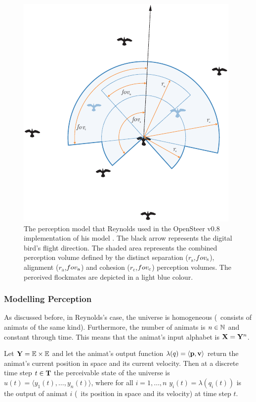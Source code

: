 \begin{figure}%
\includegraphics{fig[perception]cwr}
\caption{The perception model that Reynolds used in the OpenSteer v0.8 implementation of his model \cite{reynolds:1999}. The black arrow represents the digital bird's flight direction. The shaded area represents the combined perception volume defined by the distinct separation ($r_\mathrm{s}$,$fov_\mathrm{s}$), alignment ($r_\mathrm{a}$,$fov_\mathrm{a}$) and cohesion ($r_\mathrm{c}$,$fov_\mathrm{c}$) perception volumes. The perceived flockmates are depicted in a light blue colour.}
\label{fig:perception:cwr}
\end{figure}

\subsubsection{Modelling Perception}
As discussed before, in Reynolds's case, the universe is homogeneous (\ie\ consists of animats of the same kind). Furthermore, the number of animats is $n \in \mathbb{N}$ and constant through time. This means that the animat's input alphabet is ${\mathbf{X}}={\mathbf{Y}}^n$. 

Let ${\mathbf{Y}}=\mathbb{E} \times \mathbb{E}$ and let the animat's output function $\lambda(q)=\langle{\ensuremath{\mathbf{p}}},{\mathbf{v}}\rangle$ return the animat's current position in space and its current velocity. Then at a discrete time step $t \in {\ensuremath{\mathbf{T}}}$ the perceivable state of the universe is $u(t)=\langle y_1(t),\ldots,y_n(t)\rangle$, where for all $i=1,\ldots,n$ $y_i(t)=\lambda(q_i(t))$ is the output of animat $i$ (\ie\ its position in space and its velocity) at time step $t$. 

